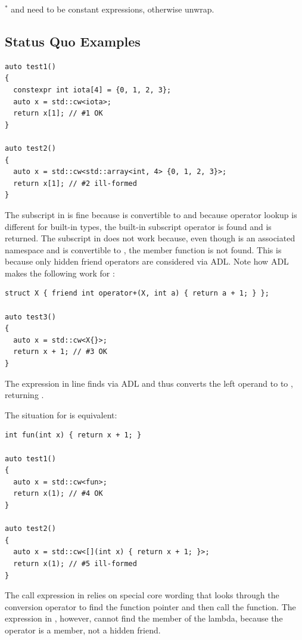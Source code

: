 \medskip
$^*$  and  need to be constant expressions, otherwise unwrap.

\subsection{Status Quo Examples}
\medskip
\begin{lstlisting}
auto test1()
{
  constexpr int iota[4] = {0, 1, 2, 3};
  auto x = std::cw<iota>;
  return x[1]; // #1 OK
}

auto test2()
{
  auto x = std::cw<std::array<int, 4> {0, 1, 2, 3}>;
  return x[1]; // #2 ill-formed
}
\end{lstlisting}

The subscript in  is fine because  is convertible to  and because
operator lookup is different for built-in types, the built-in subscript operator is found and
 is returned.
The subscript in  does not work because, even though  is an associated
namespace and  is convertible to , the  member
function is not found.
This is because only hidden friend operators are considered via ADL\@.
Note how ADL makes the following work for :
\medskip
\begin{lstlisting}
struct X { friend int operator+(X, int a) { return a + 1; } };

auto test3()
{
  auto x = std::cw<X{}>;
  return x + 1; // #3 OK
}
\end{lstlisting}
The expression  in line  finds  via ADL and thus converts
the left operand to  to , returning .

The situation for  is equivalent:
\medskip
\begin{lstlisting}
int fun(int x) { return x + 1; }

auto test1()
{
  auto x = std::cw<fun>;
  return x(1); // #4 OK
}

auto test2()
{
  auto x = std::cw<[](int x) { return x + 1; }>;
  return x(1); // #5 ill-formed
}
\end{lstlisting}
The call expression in  relies on special core wording that looks through the conversion
operator to find the function pointer and then call the function.
The expression in , however, cannot find the  member of the lambda,
because the operator is a member, not a hidden friend.

